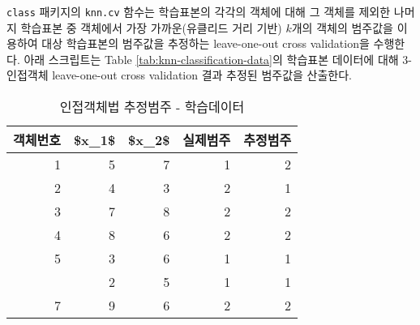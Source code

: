 \documentclass[
]{book}
\newenvironment{Shaded}{\begin{snugshade}}{\end{snugshade}}
\newcommand{\AttributeTok}[1]{\textcolor[rgb]{0.77,0.63,0.00}{#1}}
\newcommand{\ConstantTok}[1]{\textcolor[rgb]{0.00,0.00,0.00}{#1}}
\newcommand{\DecValTok}[1]{\textcolor[rgb]{0.00,0.00,0.81}{#1}}
\newcommand{\FunctionTok}[1]{\textcolor[rgb]{0.00,0.00,0.00}{#1}}
\newcommand{\NormalTok}[1]{#1}
\newcommand{\OtherTok}[1]{\textcolor[rgb]{0.56,0.35,0.01}{#1}}
\newcommand{\SpecialCharTok}[1]{\textcolor[rgb]{0.00,0.00,0.00}{#1}}
\newcommand{\StringTok}[1]{\textcolor[rgb]{0.31,0.60,0.02}{#1}}
\begin{document}
\texttt{class} 패키지의 \texttt{knn.cv} 함수는 학습표본의 각각의 객체에 대해 그 객체를 제외한 나머지 학습표본 중 객체에서 가장 가까운(유클리드 거리 기반) \(k\)개의 객체의 범주값을 이용하여 대상 학습표본의 범주값을 추정하는 leave-one-out cross validation을 수행한다. 아래 스크립트는 Table \ref{tab:knn-classification-data}의 학습표본 데이터에 대해 3-인접객체 leave-one-out cross validation 결과 추정된 범주값을 산출한다.

\begin{Shaded}
\end{Shaded}

\begin{table}

\caption{\label{tab:knn-classification-cv}인접객체법 추정범주 - 학습데이터}
\centering
\begin{tabular}[t]{rrrrr}
\toprule
객체번호 & \$x\_1\$ & \$x\_2\$ & 실제범주 & 추정범주\\
\midrule
1 & 5 & 7 & 1 & 2\\
2 & 4 & 3 & 2 & 1\\
3 & 7 & 8 & 2 & 2\\
4 & 8 & 6 & 2 & 2\\
5 & 3 & 6 & 1 & 1\\
\addlinespace
6 & 2 & 5 & 1 & 1\\
7 & 9 & 6 & 2 & 2\\
\bottomrule
\end{tabular}
\end{table}
\end{document}
